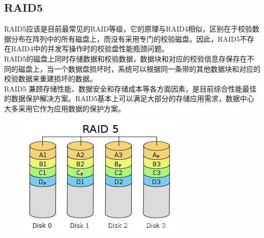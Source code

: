 \vspace{0.5cm}

\subsection{RAID5}

RAID5应该是目前最常见的RAID等级，它的原理与RAID4相似，区别在于校验数据分布在阵列中的所有磁盘上，而没有采用专门的校验磁盘。因此，RAID5不存在RAID4中的并发写操作时的校验盘性能瓶颈问题。\\

RAID5的磁盘上同时存储数据和校验数据，数据块和对应的校验信息存保存在不同的磁盘上，当一个数据盘损坏时，系统可以根据同一条带的其他数据块和对应的校验数据来重建损坏的数据。\\

RAID5 兼顾存储性能、数据安全和存储成本等各方面因素，是目前综合性能最佳的数据保护解决方案。RAID5基本上可以满足大部分的存储应用需求，数据中心大多采用它作为应用数据的保护方案。

\begin{figure}[H]
    \centering
    \includegraphics[scale=0.9]{img/C4/4-5/6.png}
\end{figure}

\newpage